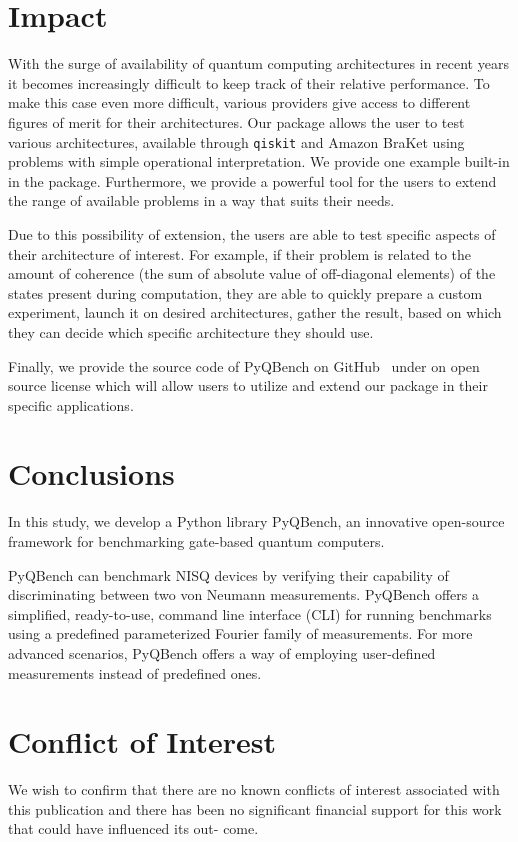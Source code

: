 \documentclass[preprint,12pt, a4paper, dvipsnames]{elsarticle}
\newcommand{\1}{{\rm 1\hspace{-0.9mm}l}}
\theoremstyle{definition}
\begin{document}
\section{Impact}
With the surge of availability of quantum computing architectures in recent
years it becomes increasingly difficult to keep track of their relative
performance. To make this case even more difficult, various providers give
access to different figures of merit for their architectures. Our package allows
the user to test various architectures, available through \texttt{qiskit} and
Amazon BraKet using problems with simple operational interpretation. We provide
one example built-in in the package. Furthermore, we provide a powerful tool for
the users to extend the range of available problems in a way that suits their
needs. 

Due to this possibility of extension, the users are able to test specific
aspects of their architecture of interest. For example, if their problem is
related to the amount of coherence (the sum of absolute value of off-diagonal
elements) of the states present during computation, they are able to quickly
prepare a custom experiment, launch it on desired architectures, gather the
result, based on which they can decide which specific architecture they should
use.

Finally, we provide the source code of PyQBench on GitHub~\cite{pyqbenchgithub} under on open
source license which will allow users to utilize and extend our package in their
specific applications.

\section{Conclusions}
\label{}

In this study, we develop  a Python library PyQBench, an innovative open-source framework for benchmarking
gate-based quantum computers.


PyQBench can benchmark NISQ devices by verifying their capability of
discriminating between two von Neumann measurements. PyQBench offers a simplified, ready-to-use,
command line interface (CLI) for running benchmarks using a predefined parameterized Fourier
family of measurements. For more advanced scenarios, PyQBench offers a way of employing user-defined
measurements instead of predefined ones.
\section{Conflict of Interest}
We wish to confirm that there are no known
conflicts of interest associated with this publication and there has been no
significant financial support for this work that could have influenced its out-
come.
\end{document}
